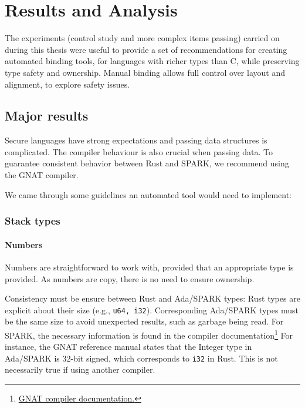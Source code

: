 \documentclass[nomenclature, english, bibtex]{kththesis}
\begin{document}

\cleardoublepage
\chapter{Results and Analysis}
\label{ch:resultsAndAnalysis}

The experiments (control study and more complex items passing) carried on during this thesis were useful to provide a set of recommendations for creating automated binding tools, for languages with richer types than C, while preserving type safety and ownership. Manual binding allows full control over layout and alignment, to explore safety issues.

\section{Major results}

Secure languages have strong expectations and passing data structures is complicated.
The compiler behaviour is also crucial when passing data. To guarantee consistent behavior between Rust and SPARK, we recommend using the GNAT compiler. 


We came through some guidelines an automated tool would need to implement:


\subsection{Stack types}
\subsubsection{Numbers}
\label{sec:numbers}
Numbers are straightforward to work with, provided that an appropriate type is provided. As numbers are copy, there is no need to ensure ownership. 

Consistency must be ensure between Rust and Ada/SPARK types: Rust types are explicit about their size (e.g., \texttt{u64, i32}). Corresponding Ada/SPARK types must be the same size to avoid unexpected results, such as garbage being read. For SPARK, the necessary information is found in the compiler documentation\footnote{\href{https://docs.adacore.com/gnat_rm-docs/html/gnat_rm/gnat_rm/implementation_defined_characteristics.html}{GNAT compiler documentation.}}
For instance, the GNAT reference manual states that the Integer type in Ada/SPARK is 32-bit signed, which corresponds to \texttt{i32} in Rust. This is not necessarily true if using another compiler.
\end{document}

